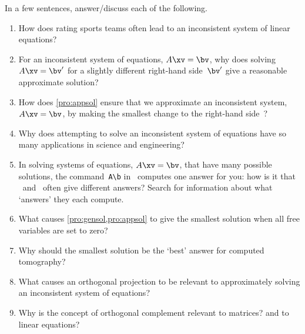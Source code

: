 \begin{exercise}  
In a few sentences, answer\slash discuss each of the following.
\begin{enumerate}
\item How does rating sports teams often lead to an inconsistent system of linear equations?

\item For an inconsistent system of equations, \(A\xv=\bv\), why does solving \(A\xv=\bv'\) for a slightly different right-hand side~\(\bv'\) give a reasonable approximate solution?

\item How does \autoref{pro:appsol} ensure that we approximate an inconsistent system, \(A\xv=\bv\), by making the smallest change to the right-hand side~\bv?

\item Why does attempting to solve an inconsistent system of equations have so many applications in science and engineering?

\item In solving systems of equations, \(A\xv=\bv\), that have many possible solutions, the command~\verb|A\b| in \script\ computes one answer for you: how is it that \script[1]\ and \script[2]\ often give different answers?  Search for information about what `answers' they each compute.

\item What causes \cref{pro:gensol,pro:appsol} to give the smallest solution when all free variables are set to zero?

\item Why should the smallest solution be the `best' answer for computed tomography?

\item What causes an orthogonal projection to be relevant to approximately solving an inconsistent system of equations?


\item Why is the concept of orthogonal complement relevant to matrices?  and to linear equations?

\end{enumerate}
\end{exercise}

\begin{comment}%
why, what caused X?
how did X occur?
what-if? what-if-not?
how does X compare with Y?
what is the evidence for X?
why is X important?
\end{comment}


